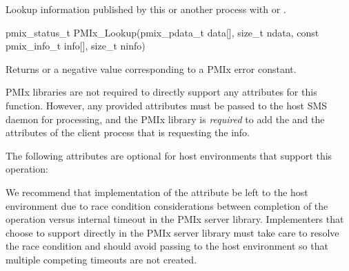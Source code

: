 \summary

Lookup information published by this or another process with  or .

\format

\cspecificstart
\begin{codepar}
pmix_status_t
PMIx_Lookup(pmix_pdata_t data[], size_t ndata,
            const pmix_info_t info[], size_t ninfo)
\end{codepar}
\cspecificend

\begin{arglist}
\end{arglist}

Returns  or a negative value corresponding to a PMIx error constant.

\reqattrstart
\ac{PMIx} libraries are not required to directly support any attributes for this function. However, any provided attributes must be passed to the host \ac{SMS} daemon for processing, and the \ac{PMIx} library is \textit{required} to add the  and the  attributes of the client process that is requesting the info.

\reqattrend

\optattrstart
The following attributes are optional for host environments that support this operation:


\optattrend

\adviceimplstart
We recommend that implementation of the  attribute be left to the host environment due to race condition considerations between completion of the operation versus internal timeout in the \ac{PMIx} server library. Implementers that choose to support  directly in the \ac{PMIx} server library must take care to resolve the race condition and should avoid passing  to the host environment so that multiple competing timeouts are not created.
\adviceimplend

\descr

